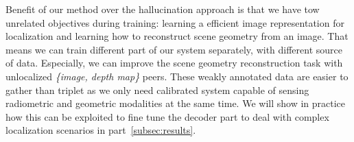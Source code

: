 Benefit of our method over the hallucination approach is that we have tow unrelated objectives during training: learning a efficient image representation for localization and learning how to reconstruct scene geometry from an image. That means we can train different part of our system separately, with different source of data. Especially, we can improve the scene geometry reconstruction task with unlocalized \textit{\{image, depth map\}} peers. These weakly annotated data are easier to gather than triplet as we only need calibrated system capable of sensing radiometric and geometric modalities at the same time. We will show in practice how this can be exploited to fine tune the decoder part to deal with complex localization scenarios in part~\ref{subsec:results}.

